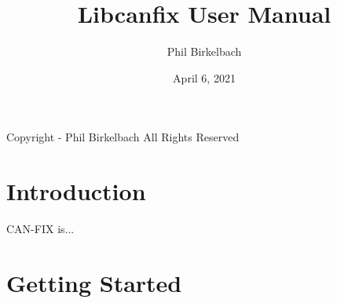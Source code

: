 

\title{Libcanfix User Manual}
\date{April 6, 2021}
\author{Phil Birkelbach}



\maketitle

\begin{flushleft}
Copyright  - Phil Birkelbach\linebreak
All Rights Reserved
\end{flushleft}

\tableofcontents
\newpage
{}
\chapter{Introduction}
CAN-FIX is...
\chapter{Getting Started}




